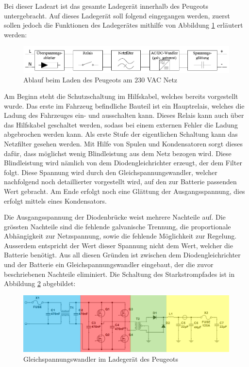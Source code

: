\newpage

Bei dieser Ladeart ist das gesamte Ladegerät innerhalb des Peugeots untergebracht. Auf dieses Ladegerät soll folgend eingegangen werden, zuerst sollen jedoch die Funktionen des Ladegerätes mithilfe von Abbildung \ref{fig:Laden_Peugeot} erläutert werden:

\begin{figure}[h]
	\centering
		\includegraphics[width=1.00\textwidth]{images/Laden_Peugeot.PNG}
	\caption{Ablauf beim Laden des Peugeots am $230$ VAC Netz}
	\label{fig:Laden_Peugeot}
\end{figure}

Am Beginn steht die Schutzschaltung im Hilfskabel, welches bereits vorgestellt wurde. Das erste im Fahrzeug befindliche Bauteil ist ein Hauptrelais, welches die Ladung des Fahrzeuges ein- und ausschalten kann. Dieses Relais kann auch über das Hilfskabel geschaltet werden, sodass bei einem externen Fehler die Ladung abgebrochen werden kann. Als erste Stufe der eigentlichen Schaltung kann das Netzfilter gesehen werden. Mit Hilfe von Spulen und Kondensatoren sorgt dieses dafür, dass möglichst wenig Blindleistung aus dem Netz bezogen wird. Diese Blindleistung wird nämlich von dem Diodengleichrichter erzeugt, der dem Filter folgt. Diese Spannung wird durch den Gleichspannungswandler, welcher nachfolgend noch detaillierter vorgestellt wird, auf den zur Batterie passenden Wert gebracht. Am Ende erfolgt noch eine Glättung der Ausgangsspannung, dies erfolgt mittels eines Kondensators.

Die Ausgangsspannung der Diodenbrücke weist mehrere Nachteile auf. Die grössten Nachteile sind die fehlende galvanische Trennung, die proportionale Abhängigkeit zur Netzspannung, sowie die fehlende Möglichkeit zur Regelung. Ausserdem entspricht der Wert dieser Spannung nicht dem Wert, welcher die Batterie benötigt. Aus all diesen Gründen ist zwischen dem Diodengleichrichter und der Batterie ein Gleichspannungswandler eingebaut, der die zuvor beschriebenen Nachteile eliminiert. Die Schaltung des Starkstrompfades ist in Abbildung \ref{fig:Ladegeraet_Peugeot} abgebildet:

\begin{figure}[h]
	\centering
		\includegraphics[width=1.00\textwidth]{images/Ladegeraet_Peugeot.PNG}
	\caption{Gleichspannungswandler im Ladegerät des Peugeots}
	\label{fig:Ladegeraet_Peugeot}
\end{figure}

